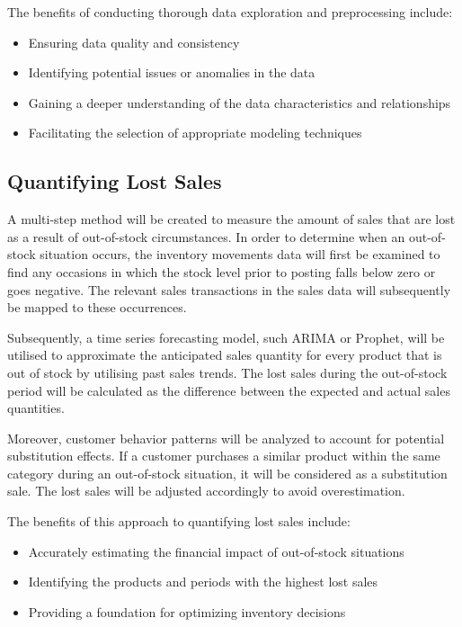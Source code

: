 \documentclass{article}
\begin{document}
The benefits of conducting thorough data exploration and preprocessing include:
\begin{itemize}
  \item Ensuring data quality and consistency
  \item Identifying potential issues or anomalies in the data
  \item Gaining a deeper understanding of the data characteristics and relationships
  \item Facilitating the selection of appropriate modeling techniques
\end{itemize}

\subsection{Quantifying Lost Sales}
A multi-step method will be created to measure the amount of sales that are lost as a result of out-of-stock circumstances. In order to determine when an out-of-stock situation occurs, the inventory movements data will first be examined to find any occasions in which the stock level prior to posting falls below zero or goes negative. The relevant sales transactions in the sales data will subsequently be mapped to these occurrences.

Subsequently, a time series forecasting model, such ARIMA or Prophet, will be utilised to approximate the anticipated sales quantity for every product that is out of stock by utilising past sales trends. The lost sales during the out-of-stock period will be calculated as the difference between the expected and actual sales quantities.

Moreover, customer behavior patterns will be analyzed to account for potential substitution effects. If a customer purchases a similar product within the same category during an out-of-stock situation, it will be considered as a substitution sale. The lost sales will be adjusted accordingly to avoid overestimation.

The benefits of this approach to quantifying lost sales include:
\begin{itemize}
  \item Accurately estimating the financial impact of out-of-stock situations
  \item Identifying the products and periods with the highest lost sales
  \item Providing a foundation for optimizing inventory decisions
\end{itemize}
\end{document}
